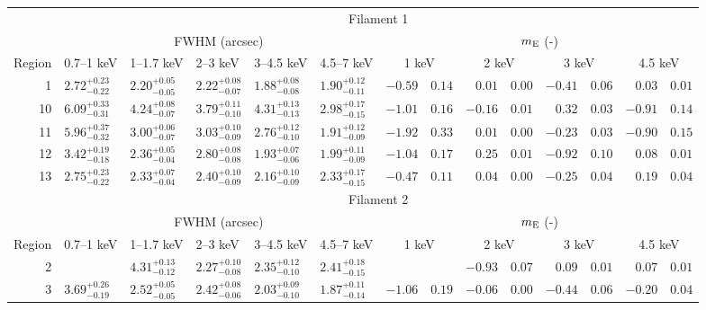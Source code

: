 \begin{tabular}{@{}rlllllr@{ $\pm$ }lr@{ $\pm$ }lr@{ $\pm$ }lr@{ $\pm$ }l@{}}
\toprule
{} & \multicolumn{13}{c}{Filament 1} \\
\cmidrule(l){2-14}
{} & \multicolumn{5}{c}{FWHM (arcsec)} & \multicolumn{8}{c}{$m_\mathrm{E}$ (-)} \\
\cmidrule(lr){2-6} \cmidrule(l){7-14}
Region & 0.7--1 keV & 1--1.7 keV & 2--3 keV & 3--4.5 keV & 4.5--7 keV
       & \multicolumn{2}{c}{1 keV} & \multicolumn{2}{c}{2 keV}
       & \multicolumn{2}{c}{3 keV} & \multicolumn{2}{c}{4.5 keV} \\
\cmidrule{1-14}
1 & ${2.72}^{+0.23}_{-0.22}$ & ${2.20}^{+0.05}_{-0.05}$ & ${2.22}^{+0.08}_{-0.07}$ & ${1.88}^{+0.08}_{-0.08}$ & ${1.90}^{+0.12}_{-0.11}$
  & $-0.59$ & $0.14$ & $0.01$ & $0.00$ & $-0.41$ & $0.06$ & $0.03$ & $0.01$ \\
10 & ${6.09}^{+0.33}_{-0.31}$ & ${4.24}^{+0.08}_{-0.07}$ & ${3.79}^{+0.11}_{-0.10}$ & ${4.31}^{+0.13}_{-0.13}$ & ${2.98}^{+0.17}_{-0.15}$
   & $-1.01$ & $0.16$ & $-0.16$ & $0.01$ & $0.32$ & $0.03$ & $-0.91$ & $0.14$ \\
11 & ${5.96}^{+0.37}_{-0.32}$ & ${3.00}^{+0.06}_{-0.07}$ & ${3.03}^{+0.10}_{-0.09}$ & ${2.76}^{+0.12}_{-0.10}$ & ${1.91}^{+0.12}_{-0.09}$
   & $-1.92$ & $0.33$ & $0.01$ & $0.00$ & $-0.23$ & $0.03$ & $-0.90$ & $0.15$ \\
12 & ${3.42}^{+0.19}_{-0.18}$ & ${2.36}^{+0.05}_{-0.04}$ & ${2.80}^{+0.08}_{-0.08}$ & ${1.93}^{+0.07}_{-0.06}$ & ${1.99}^{+0.11}_{-0.09}$
   & $-1.04$ & $0.17$ & $0.25$ & $0.01$ & $-0.92$ & $0.10$ & $0.08$ & $0.01$ \\
13 & ${2.75}^{+0.23}_{-0.22}$ & ${2.33}^{+0.07}_{-0.04}$ & ${2.40}^{+0.10}_{-0.09}$ & ${2.16}^{+0.10}_{-0.09}$ & ${2.33}^{+0.17}_{-0.15}$
   & $-0.47$ & $0.11$ & $0.04$ & $0.00$ & $-0.25$ & $0.04$ & $0.19$ & $0.04$ \\

\midrule
{} & \multicolumn{13}{c}{Filament 2} \\
\cmidrule(l){2-14}
{} & \multicolumn{5}{c}{FWHM (arcsec)} & \multicolumn{8}{c}{$m_\mathrm{E}$ (-)} \\
\cmidrule(lr){2-6} \cmidrule(l){7-14}
Region & 0.7--1 keV & 1--1.7 keV & 2--3 keV & 3--4.5 keV & 4.5--7 keV
       & \multicolumn{2}{c}{1 keV} & \multicolumn{2}{c}{2 keV}
       & \multicolumn{2}{c}{3 keV} & \multicolumn{2}{c}{4.5 keV} \\
\cmidrule{1-14}
2 & {} & ${4.31}^{+0.13}_{-0.12}$ & ${2.27}^{+0.10}_{-0.08}$ & ${2.35}^{+0.12}_{-0.10}$ & ${2.41}^{+0.18}_{-0.15}$
  & \multicolumn{2}{c}{} & $-0.93$ & $0.07$ & $0.09$ & $0.01$ & $0.07$ & $0.01$ \\
3 & ${3.69}^{+0.26}_{-0.19}$ & ${2.52}^{+0.05}_{-0.05}$ & ${2.42}^{+0.08}_{-0.06}$ & ${2.03}^{+0.09}_{-0.10}$ & ${1.87}^{+0.11}_{-0.14}$
  & $-1.06$ & $0.19$ & $-0.06$ & $0.00$ & $-0.44$ & $0.06$ & $-0.20$ & $0.04$ \\


\end{tabular}
